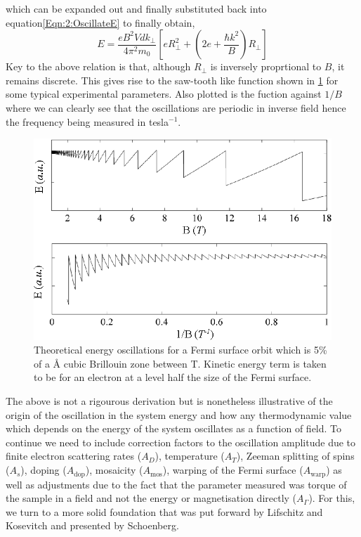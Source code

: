 which can be expanded out and finally substituted back into equation\ref{Eqn:2:OscillateE} to finally obtain,
\begin{equation}
\label{Eqn:2:OscIllustration}
E = \frac{eB^2Vdk_\perp}{4\pi^2m_0}\left[e R_\perp^2 + \left(2e + \frac{\hbar k^2}{B}\right)R_\perp\right]
\end{equation}
Key to the above relation is that, although $R_\perp$ is inversely proprtional to $B$, it remains discrete. This gives rise to the saw-tooth like function shown in \fig\ref{Fig:2:EnergyOscillations} for some typical experimental parameters. Also plotted is the fuction against $1/B$ where we can clearly see that the oscillations are periodic in inverse field hence the frequency being measured in tesla$^{-1}$.
\begin{figure}[htbp]
    \begin{center}
        \includegraphics[scale=0.9]{Chapter2-ExperimentalTechnique/Figures/TheoreticalOscillations/TheoreticalOscillations}
        \caption{Theoretical energy oscillations for a Fermi surface orbit which is 5\% of a \unit[5]{\AA} cubic Brillouin zone between \unit[1--18]{T}. Kinetic energy term is taken to be for an electron at a level half the size of the Fermi surface.}
        \label{Fig:2:EnergyOscillations}
    \end{center}
\end{figure}

The above is not a rigourous derivation but is nonetheless illustrative of the origin of the oscillation in the system energy and how any thermodynamic value which depends on the energy of the system oscillates as a function of field. To continue we need to include correction factors to the oscillation amplitude due to finite electron scattering rates ($A_D$), temperature ($A_T$), Zeeman splitting of spins ($A_s$), doping ($A_{\textrm{dop}}$), mosaicity ($A_{\textrm{mos}}$), warping of the Fermi surface ($A_{\textrm{warp}}$) as well as adjustments due to the fact that the parameter measured was torque of the sample in a field and not the energy or magnetisation directly ($A_{\Gamma}$). For this, we turn to a more solid foundation that was put forward by Lifschitz and Kosevitch and presented by Schoenberg.


